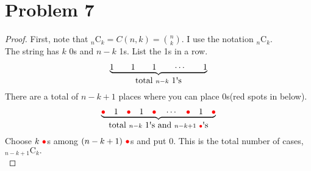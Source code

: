 \section*{Problem 7}
	\begin{proof}
		First, note that $_{n}\mathrm{C}_{k} = C(n, k) = {n \choose k}$. I use the notation $_{n}\mathrm{C}_{k}$.\\
		The string has $k$ 0\textquotesingle s and $n - k$ 1\textquotesingle s. List the 1\textquotesingle s in a row.
		\begin{align*}
			\underbrace{1\qquad 1\qquad 1\qquad \cdots\qquad 1}_{\mbox{total } n - k \mbox{ 1\textquotesingle s}}
		\end{align*}
		There are a total of $n - k + 1$ places where you can place 0\textquotesingle s(red spots in below).
		\begin{align*}
			\underbrace{{\color{red}\bullet}\quad1\quad{\color{red}\bullet}\quad1\quad{\color{red}\bullet}\quad\cdots\quad{\color{red}\bullet}\quad1\quad{\color{red}\bullet}}_{\mbox{total } n - k \mbox{ 1\textquotesingle s and } n - k + 1\ {\color{red}\bullet}\mbox{\textquotesingle s}}
		\end{align*}
		Choose ${k\ \color{red}\bullet}$\textquotesingle s among $(n - k + 1)\ {\color{red}\bullet}$\textquotesingle s and put 0. This is the total number of cases, $_{n- k + 1}\mathrm{C}_{k}.$\\
	\end{proof}